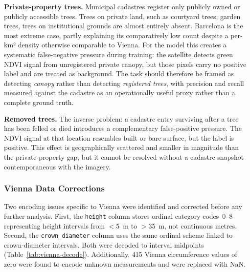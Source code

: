 \textbf{Private-property trees.}
Municipal cadastres register only publicly owned or publicly accessible trees. Trees on private land, such as courtyard trees, garden trees, trees on institutional grounds are almost entirely absent. Barcelona is the most extreme case, partly explaining its comparatively low count despite a per-km² density otherwise comparable to Vienna. For the model this creates a systematic false-negative pressure during training: the satellite detects green NDVI signal from unregistered private canopy, but those pixels carry no positive label and are treated as background. The task should therefore be framed as detecting \emph{canopy} rather than detecting \emph{registered trees}, with precision and recall measured against the cadastre as an operationally useful proxy rather than a complete ground truth.

\textbf{Removed trees.}
The inverse problem: a cadastre entry surviving after a tree has been felled or died introduces a complementary false-positive pressure. The NDVI signal at that location resembles built or bare surface, but the label is positive. This effect is geographically scattered and smaller in magnitude than the private-property gap, but it cannot be resolved without a cadastre snapshot contemporaneous with the imagery.

\subsubsection{Vienna Data Corrections}
Two encoding issues specific to Vienna were identified and corrected before any further analysis. First, the \texttt{height} column stores ordinal category codes~0--8 representing height intervals from $<$5~m to $>$35~m, not continuous metres. Second, the \texttt{crown\_diameter} column uses the same ordinal scheme linked to crown-diameter intervals. Both were decoded to interval midpoints (Table~\ref{tab:vienna-decode}). Additionally, 415 Vienna circumference values of zero were found to encode unknown measurements and were replaced with NaN.

